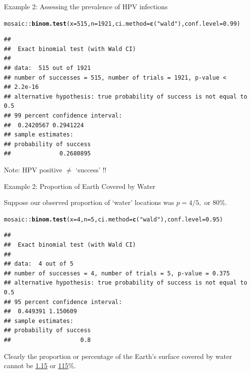 \documentclass[handout]{beamer}\usepackage[]{graphicx}\usepackage[]{color}
\newcommand{\hlnum}[1]{\textcolor[rgb]{0.686,0.059,0.569}{#1}}%
\newcommand{\hlstr}[1]{\textcolor[rgb]{0.192,0.494,0.8}{#1}}%
\newcommand{\hlopt}[1]{\textcolor[rgb]{0,0,0}{#1}}%
\newcommand{\hlstd}[1]{\textcolor[rgb]{0.345,0.345,0.345}{#1}}%
\newcommand{\hlkwc}[1]{\textcolor[rgb]{0.333,0.667,0.333}{#1}}%
\newcommand{\hlkwd}[1]{\textcolor[rgb]{0.737,0.353,0.396}{\textbf{#1}}}%
\newenvironment{knitrout}{}{} %
\begin{document}
\begin{frame}[fragile]{Example 2: Assessing the prevalence of HPV infections}

\begin{knitrout}\tiny
{}\color{fgcolor}
\begin{alltt}
\hlstd{mosaic}\hlopt{::}\hlkwd{binom.test}\hlstd{(}\hlkwc{x} \hlstd{=} \hlnum{515}\hlstd{,} \hlkwc{n} \hlstd{=} \hlnum{1921}\hlstd{,} \hlkwc{ci.method}\hlstd{=}\hlkwd{c}\hlstd{(}\hlstr{"wald"}\hlstd{),} \hlkwc{conf.level}\hlstd{=}\hlnum{0.99}\hlstd{)}
\end{alltt}
\begin{verbatim}
## 
## 	Exact binomial test (with Wald CI)
## 
## data:  515 out of 1921
## number of successes = 515, number of trials = 1921, p-value <
## 2.2e-16
## alternative hypothesis: true probability of success is not equal to 0.5
## 99 percent confidence interval:
##  0.2420567 0.2941224
## sample estimates:
## probability of success 
##              0.2680895
\end{verbatim}

\end{knitrout}
Note: HPV positive $\ne$ `success' !!
\end{frame}



\begin{frame}[fragile]{Example 2: Proportion of Earth Covered by Water}

Suppose our observed proportion of `water' locations was $p = 4/5,$ or 80\%.

\begin{knitrout}\tiny
{}\color{fgcolor}
\begin{alltt}
\hlstd{mosaic}\hlopt{::}\hlkwd{binom.test}\hlstd{(}\hlkwc{x} \hlstd{=} \hlnum{4}\hlstd{,} \hlkwc{n} \hlstd{=} \hlnum{5}\hlstd{,} \hlkwc{ci.method}\hlstd{=}\hlkwd{c}\hlstd{(}\hlstr{"wald"}\hlstd{),} \hlkwc{conf.level}\hlstd{=}\hlnum{0.95}\hlstd{)}
\end{alltt}
\begin{verbatim}
## 
## 	Exact binomial test (with Wald CI)
## 
## data:  4 out of 5
## number of successes = 4, number of trials = 5, p-value = 0.375
## alternative hypothesis: true probability of success is not equal to 0.5
## 95 percent confidence interval:
##  0.449391 1.150609
## sample estimates:
## probability of success 
##                    0.8
\end{verbatim}

\end{knitrout}

\pause 

Clearly  the proportion or percentage of the Earth's surface covered by water cannot
be \underline{1.15} or \underline{115}\%.  

\end{frame}
\end{document}
